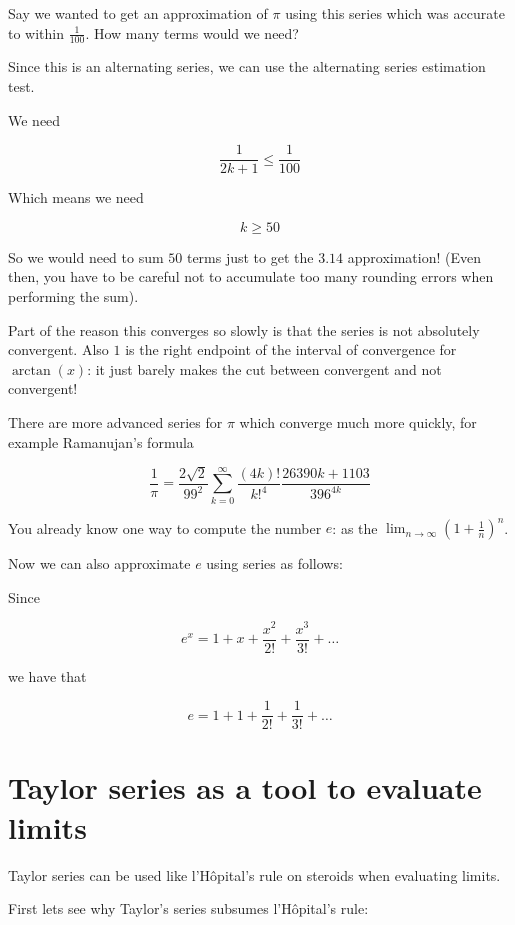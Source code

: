 \documentclass{ximera}
\begin{document}
\begin{example}
Say we wanted to get an approximation of  $\pi$ using this series which was accurate to within $\frac{1}{100}$.  How many terms would we need?

Since this is an alternating series, we can use the alternating series estimation test.

We need

\[
\frac{1}{2k+1} \leq \frac{1}{100}
\]

Which means we need

\[
k \geq 50
\]

So we would need to sum $50$ terms just to get the $3.14$ approximation! (Even then, you have to be careful not to accumulate too many rounding errors when performing the sum).

Part of the reason this converges so slowly is that the series is not absolutely convergent.  Also $1$ is the right endpoint of the interval of convergence for $\arctan(x)$:  it just barely makes the cut between convergent and not convergent!

There are more advanced series for $\pi$ which converge much more quickly, for example Ramanujan's formula

\[
\frac{1}{\pi} = \frac{2 \sqrt 2}{99^2} \sum_{k=0}^\infty \frac{(4k)!}{k!^4} \frac{26390k+1103}{396^{4k}}
\]
		
\end{example}

\begin{example}

	You already know one way to compute the number $e$:  as the $\lim_{n \to \infty} \left( 1+\frac{1}{n}\right)^n$.
	
	Now we can also approximate $e$ using series as follows:
		
	Since 
	
	\[
	e^x = 1+x+\frac{x^2}{2!}+\frac{x^3}{3!}+\dots
	\]
	
	we have that
	
	\[
	e = 1+1+\frac{1}{2!}+\frac{1}{3!}+\dots
	\]
\end{example}

\section{Taylor series as a tool to evaluate limits}

Taylor series can be used like l'H\^{o}pital's rule on steroids when evaluating limits.

First lets see why Taylor's series subsumes l'H\^{o}pital's rule:
\end{document}
